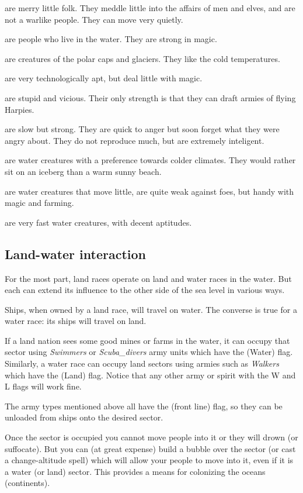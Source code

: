  are merry little folk.  They meddle little into the affairs
of men and elves, and are not a warlike people.  They can move very quietly.

 are people who live in the water.  They are strong in magic.

 are creatures of the polar caps and glaciers.  They like
the cold temperatures.

 are very technologically apt, but deal little with magic.

 are stupid and vicious.  Their only strength is that they can
draft armies of flying Harpies.

 are slow but strong.  They are quick to anger but soon forget
what they were angry about.  They do not reproduce much, but are extremely
inteligent.

 are water creatures with a preference towards colder climates.
They would rather sit on an iceberg than a warm sunny beach.

 are water creatures that move little, are quite weak against
foes, but handy with magic and farming.

 are very fast water creatures, with decent aptitudes.

\subsection{Land-water interaction}
For the most part, land races operate on land and water races in the
water.  But each can extend its influence to the other side of the sea
level in various ways.

Ships, when owned by a land race, will travel on water.  The converse
is true for a water race: its ships will travel on land.

If a land nation sees some good mines or farms in the water, it can
occupy that sector using {\em Swimmers} or {\em Scuba_divers} army
units which have the  (Water) flag.  Similarly, a water race
can occupy land sectors using armies such as {\em Walkers} which have
the  (Land) flag.  Notice that any other army or spirit with
the W and L flags will work fine.

The army types mentioned above all have the  (front line) flag,
so they can be unloaded from ships onto the desired sector.

Once the sector is occupied you cannot move people into it or they
will drown (or suffocate).  But you can (at great expense) build a
bubble over the sector (or cast a change-altitude spell) which will
allow your people to move into it, even if it is a water (or land)
sector.  This provides a means for colonizing the oceans (continents).

